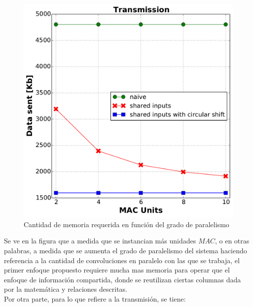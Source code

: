 \documentclass[]{IEEEphot}
\begin{document}
\begin{figure}[H]
\centering
\includegraphics[scale=0.5]{data_sent}
\caption{Cantidad de memoria requerida en función del grado de paralelismo }
\label{memoryrequired}
\end{figure}

\bigskip
Se ve en la figura que a medida que se instancian más unidades $MAC$, o en otras palabras, a medida que se aumenta el grado de paralelismo del sistema haciendo referencia a la cantidad de convoluciones en paralelo con las que se trabaja, el primer enfoque propuesto requiere mucha mas memoria para operar que el enfoque de información compartida, donde se reutilizan ciertas columnas dada por la matemática y relaciones descritas.\\

\bigskip
\bigskip
Por otra parte, para lo que refiere a la transmisión, se tiene:
\end{document}
